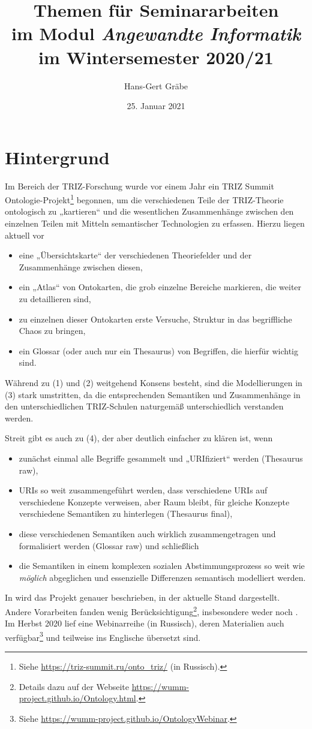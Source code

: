 \documentclass[11pt,a4paper]{article}
\title{Themen für Seminararbeiten\\ im Modul \emph{Angewandte Informatik}\\ im
  Wintersemester 2020/21}
\author{Hans-Gert Gr\"abe}
\date{25. Januar 2021}
\begin{document}
\maketitle

\section{Hintergrund}

Im Bereich der TRIZ-Forschung wurde vor einem Jahr ein TRIZ Summit
Ontologie-Projekt\footnote{Siehe \url{https://triz-summit.ru/onto_triz/} (in
  Russisch).}  begonnen, um die verschiedenen Teile der TRIZ-Theorie
ontologisch zu „kartieren“ und die wesentlichen Zusammenhänge zwischen den
einzelnen Teilen mit Mitteln semantischer Technologien zu erfassen. Hierzu
liegen aktuell vor
\begin{itemize}[noitemsep]
\item[(1)] eine „Übersichtskarte“ der verschiedenen Theoriefelder und der
  Zusammenhänge zwischen diesen,
\item[(2)] ein „Atlas“ von Ontokarten, die grob einzelne Bereiche markieren,
  die weiter zu detaillieren sind,
\item[(3)] zu einzelnen dieser Ontokarten erste Versuche, Struktur in das
  begriff\-liche Chaos zu bringen,
\item[(4)] ein Glossar (oder auch nur ein Thesaurus) von Begriffen, die
  hierfür wichtig sind.
\end{itemize}

Während zu (1) und (2) weitgehend Konsens besteht, sind die Modellierungen in
(3) stark umstritten, da die entsprechenden Semantiken und Zusammenhänge in
den unterschiedlichen TRIZ-Schulen naturgemäß unterschiedlich verstanden
werden.

Streit gibt es auch zu (4), der aber deutlich einfacher zu klären ist, wenn 
\begin{itemize}[noitemsep]
\item[(4a)] zunächst einmal alle Begriffe gesammelt und „URIfiziert“ werden
  (Thesaurus raw),
\item[(4b)] URIs so weit zusammengeführt werden, dass verschiedene URIs auf
  verschiedene Konzepte verweisen, aber Raum bleibt, für gleiche Konzepte
  verschiedene Semantiken zu hinterlegen (Thesaurus final),
\item[(4c)] diese verschiedenen Semantiken auch wirklich zusammengetragen und
  formalisiert werden (Glossar raw) und schließlich
\item[(4d)] die Semantiken in einem komplexen sozialen Abstimmungsprozess so
  weit wie \emph{möglich} abgeglichen und essenzielle Differenzen semantisch
  modelliert werden. 
\end{itemize}
In \cite{Kuryan2019} wird das Projekt genauer beschrieben, in
\cite{Kuryan2020} der aktuelle Stand dargestellt. Andere Vorarbeiten fanden
wenig Berücksichtigung\footnote{Details dazu auf der Webseite
  \url{https://wumm-project.github.io/Ontology.html}.}, insbesondere weder
\cite{IDM2011} noch \cite{VDI}. Im Herbst 2020 lief eine Webinarreihe (in
Russisch), deren Materialien auch verfügbar\footnote{Siehe
  \url{https://wumm-project.github.io/OntologyWebinar}.} und teilweise ins
Englische übersetzt sind.
\end{document}
